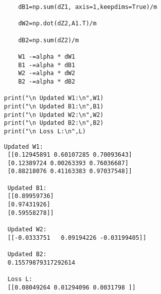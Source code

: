 \begin{lstlisting}
    dB1=np.sum(dZ1, axis=1,keepdims=True)/m

    dW2=np.dot(dZ2,A1.T)/m

    dB2=np.sum(dZ2)/m

    W1 -=alpha * dW1
    B1 -=alpha * dB1
    W2 -=alpha * dW2
    B2 -=alpha * dB2
   
print("\n Updated W1:\n",W1)
print("\n Updated B1:\n",B1)
print("\n Updated W2:\n",W2)
print("\n Updated B2:\n",B2)
print("\n Loss L:\n",L)
\end{lstlisting}
\begin{verbatim}
Updated W1:
 [[0.12945891 0.60107285 0.70093643]
 [0.12389724 0.00263393 0.76036687]
 [0.88218076 0.41163383 0.97037548]]

 Updated B1:
 [[0.89959736]
 [0.97431926]
 [0.59558278]]

 Updated W2:
 [[-0.0333751   0.09194226 -0.03199405]]

 Updated B2:
 0.15579879317292614

 Loss L:
 [[0.08049264 0.01294096 0.0031798 ]]
\end{verbatim}